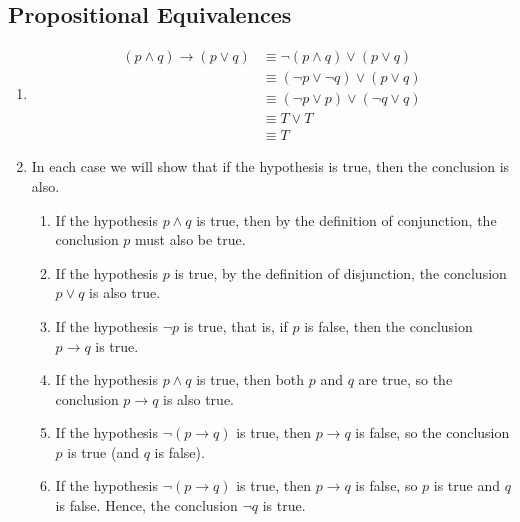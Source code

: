 \documentclass{sig-alternate-05-2015}
\begin{document}
\subsection{Propositional Equivalences}
\begin{enumerate}
\item 
\begin{align}
	(p \wedge q) \rightarrow (p \vee q)  & \equiv \neg (p \wedge q) \vee (p \vee q)\\
	& \equiv (\neg p \vee \neg q) \vee (p \vee q)\\
	& \equiv (\neg p \vee p) \vee (\neg q \vee q)\\
	& \equiv T \vee T\\
	& \equiv T
\end{align}
\item In each case we will show that if the hypothesis is true,
then the conclusion is also.
\begin{enumerate}
	\item If the hypothesis $p \wedge q$ is true,
	then by the definition of conjunction, the conclusion $p$ must
	also be true. 
	\item If the hypothesis $p$ is true, by the definition
	of disjunction, the conclusion $p \vee q$ is also true. 
	\item If the
	hypothesis $\neg p$ is true, that is, if $p$ is false, then the conclusion
	$p \rightarrow q$ is true. 
	\item If the hypothesis $p \wedge q$ is true, then both
	$p$ and $q$ are true, so the conclusion $p \rightarrow q$ is also true. 
	\item If
	the hypothesis $\neg (p \rightarrow q)$ is true, then $p \rightarrow q$ is false, so
	the conclusion $p$ is true (and $q$ is false). 
	\item If the hypothesis
	$\neg(p \rightarrow q)$ is true, then $p \rightarrow q$ is false, so $p$ is true and $q$ is
	false. Hence, the conclusion $\neg q$ is true.
\end{enumerate}
\end{enumerate}
\end{document}
